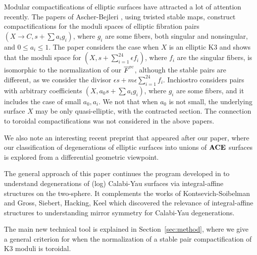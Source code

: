 \documentclass[table,x11names]{amsart}
\begin{document}
Modular compactifications of elliptic surfaces have attracted a lot of
attention recently.  The papers of Ascher-Bejleri
\cite{ascher2017log-canonical, ascher2019moduli-fibered,
  ascher2017moduli-weighted}, using twisted stable maps, construct
compactifications for the moduli spaces of elliptic fibration pairs
$(X\to C, s + \sum a_i g_i)$, where $g_i$ are some fibers, both
singular and nonsingular, and $0 \le a_i \le 1$.  The paper
\cite{ascher2019compact-moduli} considers the case when $X$ is an
elliptic K3 and shows that the moduli space for
$(X, s + \sum_{i=1}^{24} \epsilon f_i)$, where $f_i$ are the singular
fibers, is isomorphic to the normalization of our ${\overline F}^{\rm rc}$, although
the stable pairs are different, as
we consider the divisor $\epsilon s +m\epsilon \sum_{i=1}^{24} f_i$.
Inchiostro 
\cite{inchiostro20moduli-weierstrass} considers pairs with
arbitrary coefficients $(X, a_0 s + \sum a_ig_i)$, where $g_i$ are
some fibers, and it includes the case of small $a_0,a_i$.  
We not that when $a_0$ is not small, the underlying surface $X$ may be
only quasi-elliptic, with the contracted section.
The
connection to toroidal compactifications was not considered in the above
papers. 

We also note an interesting recent preprint \cite{odaka2020pl-density}
that appeared after our paper, where our classification of
degenerations of elliptic surfaces into unions of ${\bf ACE}$ surfaces is
explored from a differential geometric viewpoint.

The general approach of this paper continues the program developed in
\cite{engel2018looijenga, engel2021smoothings, alexeev2019stable-pair}
to understand degenerations of (log) Calabi-Yau surfaces via
integral-affine structures on the two-sphere. 
It complements the works of Kontsevich-Soibelman
\cite{kontsevich2006affine-structures} and Gross, Siebert, Hacking,
Keel \cite{gross2003affine-manifolds,
  gross2015mirror-symmetry-for-log, gross2016theta-functions} which
discovered the relevance of integral-affine structures to
understanding mirror symmetry for Calabi-Yau degenerations.

The main new technical tool is explained in Section~\ref{sec:method},
where we give a general criterion for when the normalization of a
stable pair compactification of K3 moduli is toroidal.

\end{document}

